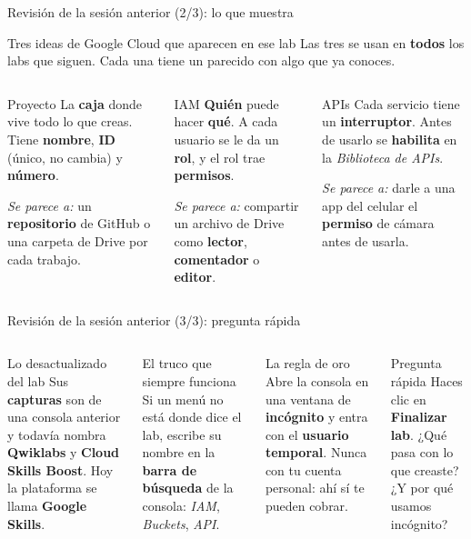 \documentclass[aspectratio=169,10pt,c]{beamer}
\begin{document}
\begin{frame}{Revisión de la sesión anterior (2/3): lo que muestra}
\begin{block}{Tres ideas de Google Cloud que aparecen en ese lab}
\small Las tres se usan en \textbf{todos} los labs que siguen. Cada una tiene un parecido con algo que ya conoces.
\end{block}
\begin{columns}[T,onlytextwidth]
\begin{exampleblock}{Proyecto}
\small La \textbf{caja} donde vive todo lo que creas. Tiene \textbf{nombre}, \textbf{ID} (único, no cambia) y \textbf{número}.\par\smallskip
\emph{Se parece a:} un \textbf{repositorio} de GitHub o una carpeta de Drive por cada trabajo.
\end{exampleblock}
\begin{exampleblock}{IAM}
\small \textbf{Quién} puede hacer \textbf{qué}. A cada usuario se le da un \textbf{rol}, y el rol trae \textbf{permisos}.\par\smallskip
\emph{Se parece a:} compartir un archivo de Drive como \textbf{lector}, \textbf{comentador} o \textbf{editor}.
\end{exampleblock}
\begin{exampleblock}{APIs}
\small Cada servicio tiene un \textbf{interruptor}. Antes de usarlo se \textbf{habilita} en la \emph{Biblioteca de APIs}.\par\smallskip
\emph{Se parece a:} darle a una app del celular el \textbf{permiso} de cámara antes de usarla.
\end{exampleblock}
\end{columns}
\end{frame}

\begin{frame}{Revisión de la sesión anterior (3/3): pregunta rápida}
\begin{columns}[T,onlytextwidth]
\begin{alertblock}{Lo desactualizado del lab}
\small Sus \textbf{capturas} son de una consola anterior y todavía nombra \textbf{Qwiklabs} y \textbf{Cloud Skills Boost}. Hoy la plataforma se llama \textbf{Google Skills}.
\end{alertblock}
\begin{exampleblock}{El truco que siempre funciona}
\small Si un menú no está donde dice el lab, escribe su nombre en la \textbf{barra de búsqueda} de la consola: \emph{IAM}, \emph{Buckets}, \emph{API}.
\end{exampleblock}
\begin{block}{La regla de oro}
\small Abre la consola en una ventana de \textbf{incógnito} y entra con el \textbf{usuario temporal}. Nunca con tu cuenta personal: ahí sí te pueden cobrar.
\end{block}
\begin{alertblock}{Pregunta rápida}
\small Haces clic en \textbf{Finalizar lab}. ¿Qué pasa con lo que creaste? ¿Y por qué usamos incógnito?
\end{alertblock}
\end{columns}
\end{frame}
\end{document}
